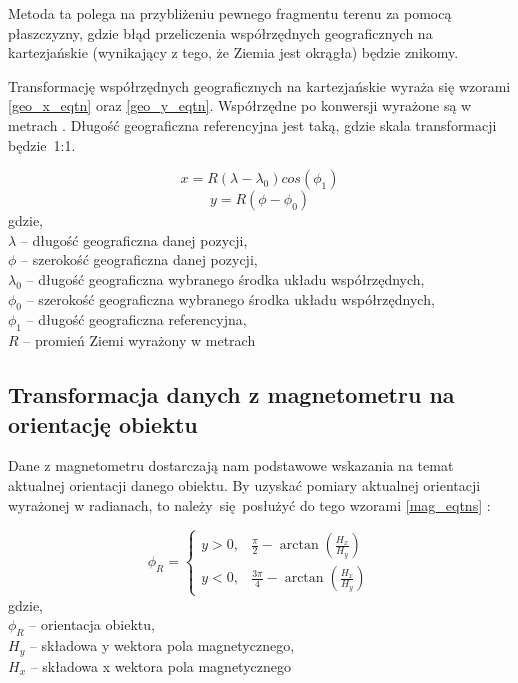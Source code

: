{{{            Metoda ta polega na przybliżeniu pewnego fragmentu terenu za pomocą płaszczyzny, gdzie błąd przeliczenia współrzędnych geograficznych na kartezjańskie (wynikający z tego, że Ziemia jest okrągła) będzie znikomy. 

            Transformację współrzędnych geograficznych na kartezjańskie wyraża się wzorami \ref{geo_x_eqtn} oraz \ref{geo_y_eqtn}. Współrzędne po konwersji wyrażone są w metrach \cite{geo_cords}. Długość geograficzna referencyjna jest taką, gdzie skala transformacji będzie~1:1. 
                
            \begin{equation}\label{geo_x_eqtn}
                x=R(\lambda-\lambda_0)cos(\phi_1)
            \end{equation}
            \begin{equation}\label{geo_y_eqtn}
                y=R(\phi - \phi_0)
            \end{equation}
            gdzie,\\
            \textbf{$\lambda$} -- długość geograficzna danej pozycji,\\
            \textbf{$\phi$} -- szerokość geograficzna danej pozycji,\\
            \textbf{$\lambda_0$} -- długość geograficzna wybranego środka układu współrzędnych,\\
             \textbf{$\phi_0$} -- szerokość geograficzna wybranego środka układu współrzędnych,\\
             \textbf{$\phi_1$} -- długość geograficzna referencyjna, \\
             \textbf{$R$} -- promień Ziemi wyrażony w metrach\\
        }
    }
    \label{mag_to_yaw_transform}
    \subsection{Transformacja danych z magnetometru na orientację obiektu}
    {
        Dane z magnetometru dostarczają nam podstawowe wskazania na temat aktualnej orientacji danego obiektu. By uzyskać pomiary aktualnej orientacji wyrażonej w radianach, to należy~się~posłużyć do tego wzorami \ref{mag_eqtns} \cite{magnetometer}:
        
        \begin{equation}\label{mag_eqtns}
            \phi_R=\begin{cases}
			y>0, & \text{$\frac{\pi}{2} - \arctan(\frac{H_x}{H_y})$}\\
            y<0, & \text{$\frac{3\pi}{4} - \arctan(\frac{H_x}{H_y})$}
    		\end{cases}
        \end{equation}
        gdzie,\\
        $\phi_R$ -- orientacja obiektu,\\
        $H_y$ -- składowa y wektora pola magnetycznego,\\
        $H_x$ -- składowa x wektora pola magnetycznego\\
    }
    
}
